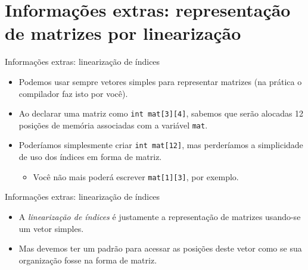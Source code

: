 \documentclass[handout]{beamer}
\newcommand{\cod}[1]{\texttt{#1}}
\begin{document}

\section{Informações extras: representação de matrizes por linearização}

\begin{frame}[fragile]{Informações extras: linearização de índices}

    \begin{itemize}
        \item Podemos usar sempre vetores simples para representar matrizes (na prática o compilador faz isto por você).

        \item Ao declarar uma matriz como \cod{int mat[3][4]}, sabemos que serão alocadas 12 posições de memória associadas com a variável \cod{mat}.

        \item Poderíamos simplesmente criar \cod{int mat[12]}, mas perderíamos a simplicidade de uso dos índices em forma de matriz.
        \begin{itemize}
            \item Você não mais poderá escrever \cod{mat[1][3]}, por exemplo.
        \end{itemize}
    \end{itemize}

\end{frame}

\begin{frame}[fragile]{Informações extras: linearização de índices}

    \begin{itemize}
        \item A {\it linearização de índices} é justamente a representação de matrizes usando-se um vetor simples.
        \item Mas devemos ter um padrão para acessar as posições deste vetor como se sua organização fosse na forma de matriz.
    \end{itemize}

\end{frame}
\end{document}
